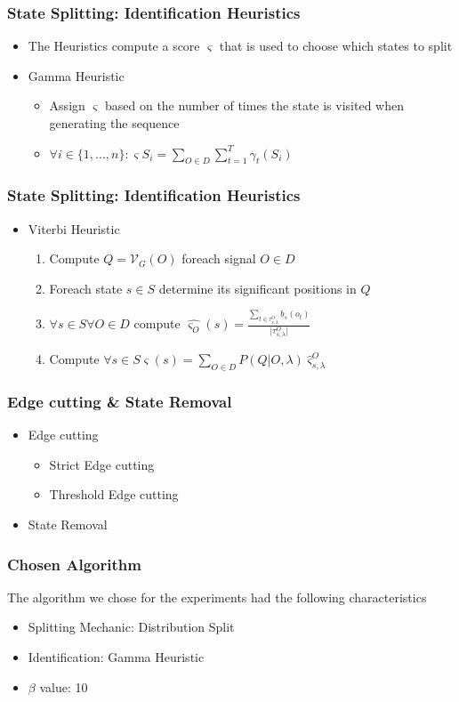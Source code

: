 \begin{frame}
  \frametitle{State Splitting: Identification Heuristics} 
  \begin{itemize}
  	\item The Heuristics compute a score $\varsigma$ that is used to choose which states to split
  	\item Gamma Heuristic
	\begin{itemize}
		\item Assign $\varsigma$ based on the number of times the state is visited when generating the sequence
		\item $\forall i \in \{1, ...,n\}: \varsigma S_i = \sum_{O \in D} \sum_{t=1}^T \gamma_t(S_i)$
	\end{itemize}
  \end{itemize}
  
\end{frame}


\begin{frame}
  \frametitle{State Splitting: Identification Heuristics} 
  \begin{itemize}
  	\item Viterbi Heuristic
  	\begin{enumerate}
  		\item Compute $Q = \mathcal{V}_G(O)$ foreach signal $O \in D$
  		\item Foreach state $s \in S$ determine its significant positions in $Q$ 
  		\item $\forall s \in S \forall O \in D $ compute $\hat{\varsigma_O}(s) = \frac{\sum_{t \in \tau_{s,\lambda}^O} b_s(o_t)}{\vert \tau_{s,\lambda}^O \vert}$
  		\item Compute $\forall s \in S \varsigma (s) = \sum_{O \in D} P(Q \vert O, \lambda) \hat{\varsigma}_{s,\lambda}^O$
  	\end{enumerate}
  \end{itemize}
  
\end{frame}

\begin{frame}
  \frametitle{Edge cutting \& State Removal} 

	\begin{itemize}
		\item Edge cutting
			\begin{itemize}
				\item Strict Edge cutting
				\item Threshold Edge cutting
			\end{itemize}
		\item State Removal
	\end{itemize}

\end{frame}


\begin{frame}
  \frametitle{Chosen Algorithm} 
	
	The algorithm we chose for the experiments had the following characteristics
	\begin{itemize}
		\item Splitting Mechanic: Distribution Split
		\item Identification: Gamma Heuristic
		\item $\beta$ value: 10
	\end{itemize}

\end{frame}







